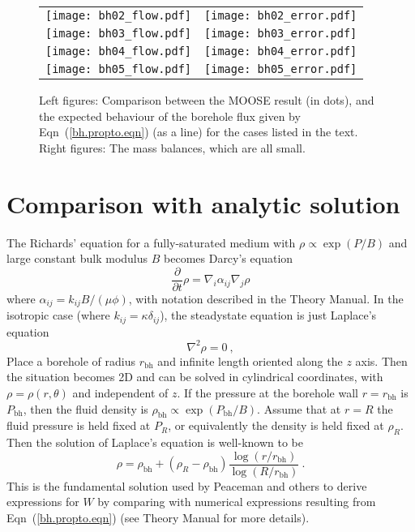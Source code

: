 \begin{figure}[htb]
\centering
\begin{tabular}{cc}
\texttt{[image: bh02\_flow.pdf]} &
\texttt{[image: bh02\_error.pdf]} \\
\texttt{[image: bh03\_flow.pdf]} &
\texttt{[image: bh03\_error.pdf]} \\
\texttt{[image: bh04\_flow.pdf]} &
\texttt{[image: bh04\_error.pdf]} \\
\texttt{[image: bh05\_flow.pdf]} &
\texttt{[image: bh05\_error.pdf]} \\
\end{tabular}
\caption{Left figures: Comparison between the MOOSE result (in dots), and the
  expected behaviour of the borehole flux given by
  Eqn~(\ref{bh.propto.eqn}) (as a line) for the cases listed in the
  text.  Right
  figures: The mass balances, which are all small.}
\label{bh02_05.fig}
\end{figure}

\section{Comparison with analytic solution}
The Richards' equation for a fully-saturated medium with $\rho \propto
\exp(P/B)$ and large constant bulk modulus $B$ becomes Darcy's equation
\begin{equation}
\frac{\partial}{\partial t}\rho =  \nabla_{i}\alpha_{ij}\nabla_{j}\rho
\end{equation}
where $\alpha_{ij} = k_{ij}B/(\mu\phi)$, with notation described
in the Theory Manual.   In the isotropic case (where $k_{ij} =
\kappa \delta_{ij}$), the steadystate equation is just Laplace's
equation
\begin{equation}
\nabla^{2}\rho = 0 \ ,
\end{equation}
Place a borehole of radius $r_{\mathrm{bh}}$ and infinite length
oriented along the $z$ axis.  Then the situation becomes 2D and can be
solved in cylindrical coordinates, with $\rho=\rho(r,\theta)$ and
independent of $z$.  If the pressure at the borehole wall
$r=r_{\mathrm{bh}}$ is $P_{\mathrm{bh}}$, then the fluid density is
$\rho_{\mathrm{bh}} \propto \exp(P_{\mathrm{bh}}/B)$.  Assume that at
$r=R$ the fluid pressure is held fixed at $P_{R}$, or equivalently the
density is held fixed at $\rho_{R}$.  Then the solution of Laplace's
equation is well-known to be
\begin{equation}
\rho = \rho_{\mathrm{bh}} + (\rho_{R} - \rho_{\mathrm{bh}})
\frac{\log(r/r_{\mathrm{bh}})}{\log(R/r_{\mathrm{bh}})} \ .
\label{eqn.log.bh}
\end{equation}
This is the fundamental solution used by Peaceman and others to derive
expressions for $W$ by comparing with numerical expressions resulting
from Eqn~(\ref{bh.propto.eqn}) (see Theory Manual for more details).

